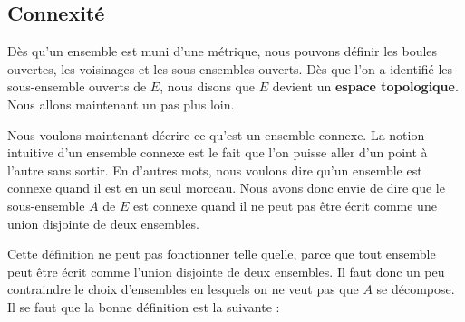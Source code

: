 \documentclass[a4paper,12pt]{book}
\theoremstyle{mes_exemples}	\newtheorem{exemple}[numtho]{Exemple}
\theoremstyle{mes_tho}
\newcommand{\defe}[2]{\textbf{#1}\index{#2}}
\begin{document}
\subsection{Connexité}

Dès qu'un ensemble est muni d'une métrique, nous pouvons définir les boules ouvertes, les voisinages et les sous-ensembles ouverts. Dès que l'on a identifié les sous-ensemble ouverts de $E$, nous disons que $E$ devient un \defe{espace topologique}{Espace topologique}. Nous allons maintenant un pas plus loin.

Nous voulons maintenant décrire ce qu'est un ensemble connexe. La notion intuitive d'un ensemble connexe est le fait que l'on puisse aller d'un point à l'autre sans sortir. En d'autres mots, nous voulons dire qu'un ensemble est connexe quand il est en un seul morceau. Nous avons donc envie de dire que le sous-ensemble $A$ de $E$ est connexe quand il ne peut pas être écrit comme une union disjointe de deux ensembles.

Cette définition ne peut pas fonctionner telle quelle, parce que tout ensemble peut être écrit comme l'union disjointe de deux ensembles. Il faut donc un peu contraindre le choix d'ensembles en lesquels on ne veut pas que $A$ se décompose. Il se faut que la bonne définition est la suivante :
\end{document}
